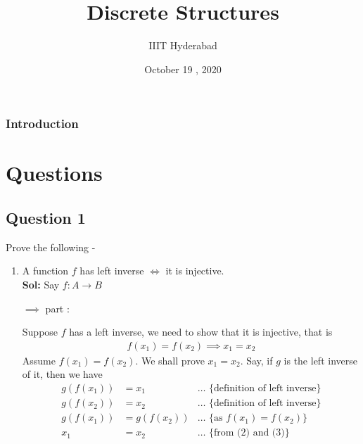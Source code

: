 \documentclass[xcolor=svgnames]{beamer}
\title[Discrete Structures]{Discrete Structures} %
\author{IIIT Hyderabad} %
\institute[] %
{
Monsoon 2020 \\ %
\medskip
\textit{Tutorial 10} %
}
\date{October 19 , 2020} %
\begin{document}
\begin{frame}
\titlepage %
\end{frame}

\begin{frame}
\frametitle{Introduction} %
\tableofcontents %
\end{frame}


\section{Questions}

\subsection{Question 1}

\begin{frame}
    Prove the following -
    \begin{enumerate}
    \item A function $f$ has left inverse $\iff$ it is injective.
    \\ \textbf{Sol:} Say $f:A \rightarrow B$
    
    $\implies$ part :
    
    Suppose $f$ has a left inverse, we need to show that it is injective, that is 
    \begin{align}
    f(x_1) = f(x_2) \implies x_1 = x_2
    \end{align}
    Assume $f(x_1) = f(x_2)$. We shall prove $x_1 = x_2$. Say, if  $g$ is the left inverse of it, then we have 
    \begin{align}
        g(f(x_1)) &= x_1 & \ldots \text{ \{definition of left inverse\}}
        \\ g(f(x_2)) &= x_2 & \ldots \text{ \{definition of left inverse\}}
        \\g(f(x_1)) &= g(f(x_2)) & \ldots \text{ \{as $f(x_1)  = f(x_2)$\}}
        \\ x_1 &= x_2 & \ldots \text{ \{from (2) and (3)\}}
    \end{align}
\end{enumerate}

\end{frame}
\end{document}
